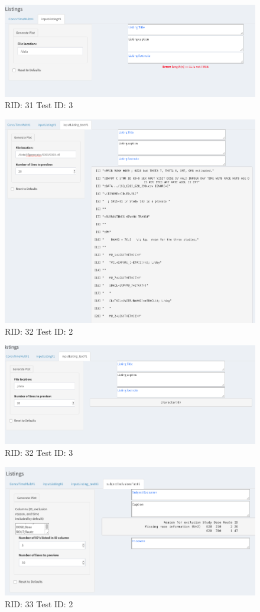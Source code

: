 \begin{figure}[H]
\includegraphics[width=.8\textwidth]{screencaps/31-3-1.png}
\caption{RID: 31 Test ID: 3}
\end{figure}
\begin{figure}[H]
\includegraphics[width=.8\textwidth]{screencaps/32-2-1.png}
\caption{RID: 32 Test ID: 2}
\end{figure}
\begin{figure}[H]
\includegraphics[width=.8\textwidth]{screencaps/32-3-1.png}
\caption{RID: 32 Test ID: 3}
\end{figure}
\begin{figure}[H]
\includegraphics[width=.8\textwidth]{screencaps/33-2-1.png}
\caption{RID: 33 Test ID: 2}
\end{figure}
